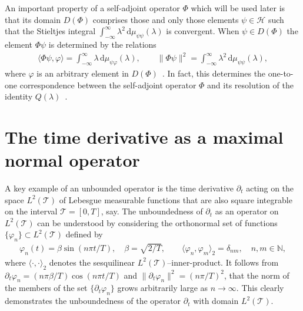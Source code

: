 \documentclass[leqno,onefignum,onetabnum]{siamltex1213}
\renewcommand{\d}{\mathrm{d}}
\newcommand{\Tc}{\mathcal{T}}
\newcommand{\Hs}{\mathscr{H}}
\begin{document}
An important property of a self-adjoint operator $\Phi$ which will be
used later is that its domain $D(\Phi)$ comprises those and only those
elements $\psi\in\Hs$ such that the Stieltjes integral
$\int_{-\infty}^\infty\lambda^2\,\d\mu_{\psi\psi}(\lambda)$ is convergent. When $\psi\in D(\Phi)$ the element
$\Phi\psi$ is determined by the relations~\cite{Stone:64}      
%
\begin{align}\label{eq:X_Q_Correspondence}
  \langle\Phi\psi,\varphi\rangle=\int_{-\infty}^\infty\lambda\,\d\mu_{\psi\varphi}(\lambda), \qquad
  \|\Phi\psi\|^2=\int_{-\infty}^\infty\lambda^2\,\d\mu_{\psi\psi}(\lambda),
\end{align}
%
where $\varphi$ is an arbitrary element in $D(\Phi)$~\cite{Stone:64}. In fact,
this determines the one-to-one correspondence between the
self-adjoint operator $\Phi$ and its resolution of the identity
$Q(\lambda)$~\cite{Stone:64}. 





\section{The time derivative as a maximal normal
  operator}\label{sec:Time_Derivative}
%
A key example of an unbounded operator is the time derivative
$\partial_t$ acting on the space $L^2(\Tc)$ of Lebesgue measurable functions
that are also square integrable on the interval $\Tc=[0,T]$, say. The
unboundedness of $\partial_t$ as an operator on $L^2(\Tc)$ can be 
understood by considering the orthonormal set of functions
$\{\varphi_n\}\subset L^2(\Tc)$ defined by     
%
\begin{align}\label{eq:Orthonormal}
  \varphi_n(t)=\beta\sin(n\pi t/T), \quad
  \beta=\sqrt{2/T},
  \qquad
  \langle\varphi_n,\varphi_m\rangle_2=\delta_{nm}, \quad
  n,m\in\mathbb{N},
\end{align}
%
where $\langle\cdot,\cdot\rangle_2$ denotes the sesquilinear
$L^2(\Tc)$--inner-product. It follows from $\partial_t\varphi_n=(n\pi\beta/T)\cos(n\pi t/T)$
and $\|\partial_t\varphi_n\|^2=(n\pi/T)^2$, that the norm of the members of the set
$\{\partial_t\varphi_n\}$ grows arbitrarily large as $n\to\infty$. This clearly demonstrates
the unboundedness of the operator $\partial_t$ with domain $L^2(\Tc)$.
\end{document}
